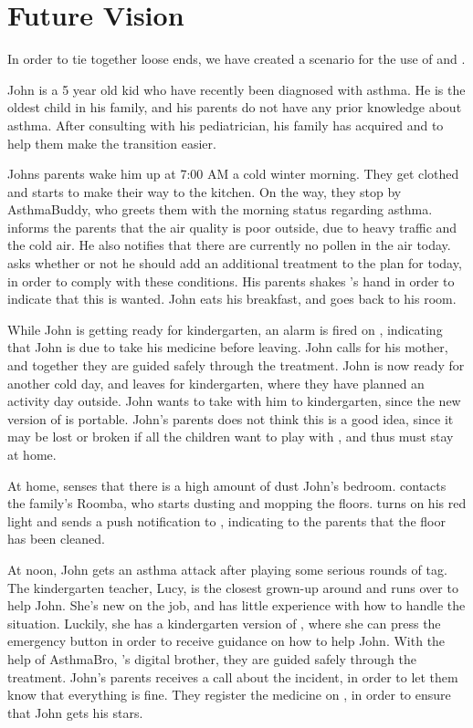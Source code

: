\section{Future Vision}
\label{sec:futurevision}

In order to tie together loose ends, we have created a scenario for the use of \app{} and \buddy{}.

John is a 5 year old kid who have recently been diagnosed with asthma. He is the oldest child in his family, and his parents do not have any prior knowledge about asthma. After consulting with his pediatrician, his family has acquired \buddy{} and \app{} to help them make the transition easier. 

Johns parents wake him up at 7:00 AM a cold winter morning. They get clothed and starts to make their way to the kitchen. On the way, they stop by AsthmaBuddy, who greets them with the morning status regarding asthma. \buddy{} informs the parents that the air quality is poor outside, due to heavy traffic and the cold air. He also notifies that there are currently no pollen in the air today. \buddy{} asks whether or not he should add an additional treatment to the plan for today, in order to comply with these conditions. His parents shakes \buddy{}'s hand in order to indicate that this is wanted. John eats his breakfast, and goes back to his room. 

While John is getting ready for kindergarten, an alarm is fired on \buddy{}, indicating that John is due to take his medicine before leaving. John calls for his mother, and together they are guided safely through the treatment. John is now ready for another cold day, and leaves for kindergarten, where they have planned an activity day outside. John wants to take \ab{} with him to kindergarten, since the new version of \ab{} is portable. John's parents does not think this is a good idea, since it may be lost or broken if all the children want to play with \ab{}, and thus \ab{} must stay at home.

At home, \buddy{} senses that there is a high amount of dust John's bedroom. \buddy{} contacts the family's Roomba, who starts dusting and mopping the floors. \buddy{} turns on his red light and sends a push notification to \app{}, indicating to the parents that the floor has been cleaned. 

At noon, John gets an asthma attack after playing some serious rounds of tag. The kindergarten teacher, Lucy, is the closest grown-up around and runs over to help John. She's new on the job, and has little experience with how to handle the situation. Luckily, she has a kindergarten version of \app{}, where she can press the emergency button in order to receive guidance on how to help John. With the help of AsthmaBro, \buddy{}'s digital brother, they are guided safely through the treatment. John's parents receives a call about the incident, in order to let them know that everything is fine. They register the medicine on \app{}, in order to ensure that John gets his stars.

